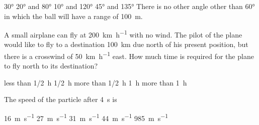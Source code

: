 \documentclass{../../../oss-ap12ibhl-print}
\begin{document}
\begin{questions}
  \begin{minipage}{.38\linewidth}
  \end{minipage}
  \begin{minipage}{.61\linewidth}
    \begin{choices}
      \choice\ang{30}
      \choice\ang{20} and \ang{80}
      \choice\ang{10} and \ang{120}
      \choice\ang{45} and \ang{135}
      \choice There is no other angle other than \ang{60} in which the ball
      will have a range of \SI{100}{\metre}.
    \end{choices}
  \end{minipage}

  \uplevel{\rule{\linewidth}{.6pt}}
  
  \question A small airplane can fly at \SI{200}{\kilo\metre\per\hour} with no
  wind. The pilot of the plane would like to fly to a destination
  \SI{100}{\kilo\metre} due north of his present position, but there is a
  crosswind of \SI{50}{\kilo\metre\per\hour} east. How much time is required
  for the plane to fly north to its destination?
  \begin{choices}
    \choice less than \SI{1/2}{\hour}
    \choice \SI{1/2}{\hour}
    \choice more than \SI{1/2}{\hour}
    \choice \SI{1}{\hour}
    \choice more than \SI{1}{\hour}
  \end{choices}

  \uplevel{\rule{\linewidth}{.6pt}}
  

  \question The speed of the particle after \SI{4}{\second} is

  \begin{oneparchoices}
    \choice\SI{16}{\metre\per\second}\hspace{.27in}
    \choice\SI{27}{\metre\per\second}\hspace{.27in}
    \choice\SI{31}{\metre\per\second}\hspace{.27in}
    \choice\SI{44}{\metre\per\second}\hspace{.27in}
    \choice\SI{985}{\metre\per\second}
  \end{oneparchoices}
  \label{q:particle1}
    

\end{questions}
\end{document}
